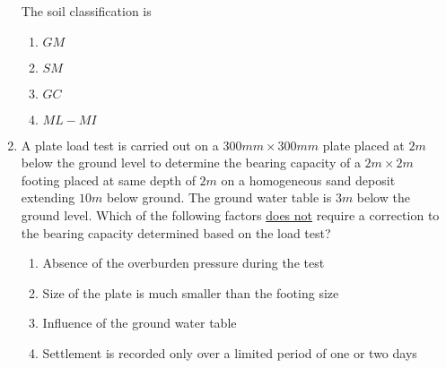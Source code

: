 \documentclass[journal]{IEEEtran}
\begin{document}
\begin{enumerate}[start=25]
The soil classification is
\begin{enumerate}
    \item $GM$
    \item $SM$
    \item $GC$
    \item $ML-MI$
\end{enumerate}
\item A plate load test is carried out on a $300 mm \times 300 mm$ plate placed at $2 m$ below the ground level to determine the bearing capacity of a $2 m\times 2 m$ footing placed at same depth of $2 m$ on a homogeneous sand deposit extending $10 m$ below ground. The ground water table is $3 m$ below the ground level. Which of the following factors \underline{does not} require a correction to the bearing capacity determined based on the load test?
\begin{enumerate}
    \item Absence of the overburden pressure during the test
    \item Size of the plate is much smaller than the footing size
    \item Influence of the ground water table
    \item Settlement is recorded only over a limited period of one or two days
\end{enumerate}
\end{enumerate}
\end{document}
